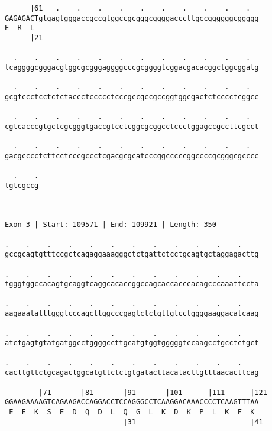 \documentclass{article}
\begin{document}
\begin{Verbatim}
      |61   .    .    .    .    .    .    .    .    .    .  
GAGAGACTgtgagtgggaccgccgtggccgcgggcggggacccttgccggggggcggggg
E  R  L                                                     
      |21                                                   
  
  .    .    .    .    .    .    .    .    .    .    .    .  
tcaggggcgggacgtggcgcgggaggggcccgcggggtcggacgacacggctggcggatg
                                                            
  .    .    .    .    .    .    .    .    .    .    .    .  
gcgtccctcctctctaccctccccctcccgccgccgccggtggcgactctcccctcggcc
                                                            
  .    .    .    .    .    .    .    .    .    .    .    .  
cgtcacccgtgctcgcgggtgaccgtcctcggcgcggcctccctggagccgccttcgcct
                                                            
  .    .    .    .    .    .    .    .    .    .    .    .  
gacgcccctcttcctcccgccctcgacgcgcatcccggcccccggccccgcgggcgcccc
                                                            
  .    .
tgtcgccg
        
        
 
Exon 3 | Start: 109571 | End: 109921 | Length: 350
 
.    .    .    .    .    .    .    .    .    .    .    .    
gccgcagtgtttccgctcagaggaaagggctctgattctcctgcagtgctaggagacttg
                                                            
.    .    .    .    .    .    .    .    .    .    .    .    
tgggtggccacagtgcaggtcaggcacaccggccagcaccacccacagcccaaattccta
                                                            
.    .    .    .    .    .    .    .    .    .    .    .    
aagaaatatttgggtcccagcttggcccgagtctctgttgtcctggggaaggacatcaag
                                                            
.    .    .    .    .    .    .    .    .    .    .    .    
atctgagtgtatgatggcctggggccttgcatgtggtgggggtccaagcctgcctctgct
                                                            
.    .    .    .    .    .    .    .    .    .    .    .    
cacttgttctgcagactggcatgttctctgtgatacttacatacttgtttaacacttcag
                                                            
        |71       |81       |91       |101      |111      |121
GGAAGAAAAGTCAGAAGACCAGGACCTCCAGGGCCTCAAGGACAAACCCCTCAAGTTTAA
 E  E  K  S  E  D  Q  D  L  Q  G  L  K  D  K  P  L  K  F  K 
                            |31                           |41
  

\end{Verbatim}
\end{document}
